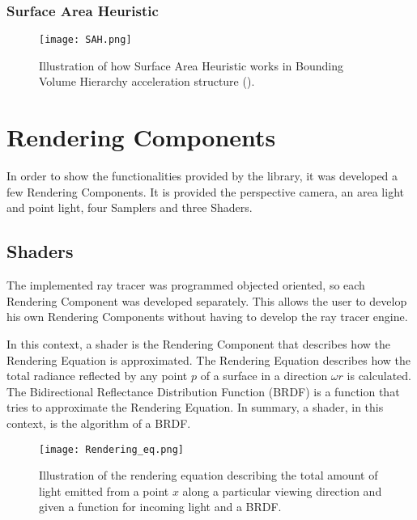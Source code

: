 \subsubsection{Surface Area Heuristic}

\begin{figure}[H]
	\centering
	\caption{Illustration of how Surface Area Heuristic works in Bounding Volume Hierarchy acceleration structure (\cite{SAH}).}
	\label{SAH.}
	\texttt{[image: SAH.png]}
\end{figure}


\section{Rendering Components}

\par
In order to show the functionalities provided by the library, it was developed a few Rendering Components.
It is provided the perspective camera, an area light and point light, four Samplers and three Shaders.

\subsection{Shaders}

\par
The implemented ray tracer was programmed objected oriented, so each Rendering Component was developed separately.
This allows the user to develop his own Rendering Components without having to develop the ray tracer engine.

\par
In this context, a shader is the Rendering Component that describes how the Rendering Equation is approximated.
The Rendering Equation describes how the total radiance reflected by any point
$p$
of a surface in a direction
$\omega$$r$
is calculated.
The Bidirectional Reflectance Distribution Function (BRDF) is a function that tries to approximate the Rendering Equation.
In summary, a shader, in this context, is the algorithm of a BRDF.

\begin{figure}[H]
	\centering
	\caption{Illustration of the rendering equation describing the total amount of light emitted from a point
	$x$
	along a particular viewing direction and given a function for incoming light and a BRDF.}
	\label{Rendering_Equation.}
	\texttt{[image: Rendering\_eq.png]}
\end{figure}

